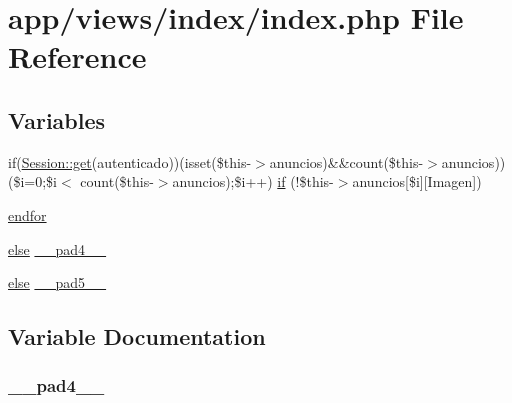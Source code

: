 \hypertarget{app_2views_2index_2index_8php}{}\section{app/views/index/index.php File Reference}
\label{app_2views_2index_2index_8php}
\subsection*{Variables}
\begin{DoxyCompactItemize}
\item 
if(\hyperlink{class_session_a5b48fff21f9141b53ba79506b6b4375e}{Session\+::get}(\textquotesingle{}autenticado\textquotesingle{}))(isset(\$this-\/$>$anuncios)\&\&count(\$this-\/$>$anuncios))(\$i=0;\$i$<$ count(\$this-\/$>$anuncios);\$i++) \hyperlink{app_2views_2index_2index_8php_a3d726968fd3dc3d64cac837a26187799}{if} (!\$this-\/$>$anuncios\mbox{[}\$i\mbox{]}\mbox{[}\textquotesingle{}Imagen\textquotesingle{}\mbox{]})
\item 
\hyperlink{app_2views_2index_2index_8php_ae8fdc27183f296411bac00ed522ee1ac}{endfor}
\item 
\hyperlink{header_8php_aafe3d66a75b8195106636aa01f257a66}{else} \hyperlink{app_2views_2index_2index_8php_a4b953ca50a29aec287fd26dcb69696db}{\+\_\+\+\_\+pad4\+\_\+\+\_\+}
\item 
\hyperlink{header_8php_aafe3d66a75b8195106636aa01f257a66}{else} \hyperlink{app_2views_2index_2index_8php_a7c49bc58fb30f37aad799fdeb4877a8b}{\+\_\+\+\_\+pad5\+\_\+\+\_\+}
\end{DoxyCompactItemize}


\subsection{Variable Documentation}
\hypertarget{app_2views_2index_2index_8php_a4b953ca50a29aec287fd26dcb69696db}{}
\subsubsection[{\+\_\+\+\_\+pad4\+\_\+\+\_\+}]{ \+\_\+\+\_\+pad4\+\_\+\+\_\+}\label{app_2views_2index_2index_8php_a4b953ca50a29aec287fd26dcb69696db}
\hypertarget{app_2views_2index_2index_8php_a7c49bc58fb30f37aad799fdeb4877a8b}{}

